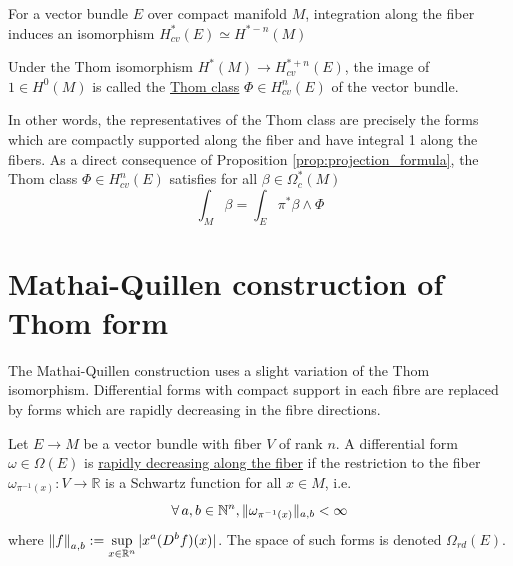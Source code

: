 \begin{thm} %
	For a vector bundle $E$ over compact manifold $M$,
	integration along the fiber induces an isomorphism
	 $H^*_{cv}(E) \simeq H^{*-n}(M)$
\end{thm}
\begin{defn}
	Under the Thom isomorphism $H^*(M)\to H_{cv}^{*+n}(E)$, the
	image of $1\in H^0(M)$ is called the \underline{Thom class}  $\Phi\in
	H_{cv}^n(E)$ of the vector bundle.
\end{defn}
In other words, the representatives of the Thom class are precisely the forms
which are compactly supported along the fiber and have integral 1 along the
fibers. As a direct consequence of Proposition \ref{prop:projection_formula},
the Thom class $\Phi \in H_{cv}^n(E)$ satisfies for all $\beta \in \Omega^*_c(M)$
\begin{equation} \label{eq:thom_form_property}
	\int_M \beta = \int_E \pi^*\beta \wedge \Phi
\end{equation}


\section{Mathai-Quillen construction of Thom form}
\label{section:mq_formula}
The Mathai-Quillen construction uses a slight variation of the Thom isomorphism.
Differential forms with compact support in each fibre are replaced by forms
which are rapidly decreasing in the fibre directions. 

\begin{defn}
	Let $E\to M$ be a vector bundle with fiber  $V$ of rank  $n$.
	A differential form $\omega\in \Omega(E)$ is \underline{rapidly decreasing
	along the fiber} if the restriction to the fiber 
	$\omega_{\pi^{-1}(x)} : V \to \mathbb{R}$ is a Schwartz function for all $x\in M$,
	i.e.
	 \[
		 \fall a,b \in \mathbb{N}^n, \norm[*]{\omega_{\pi^{-1}(x)}}_{a,b} < \infty
	\] 
	where $\displaystyle \norm{f}_{a,b} := \sup_{x\in \mathbb{R}^n}\abs[*]{x^a(D^bf)(x)}$.
	The space of such forms is denoted $\Omega_{rd}(E)$.
\end{defn}

\vspace{-1ex}


